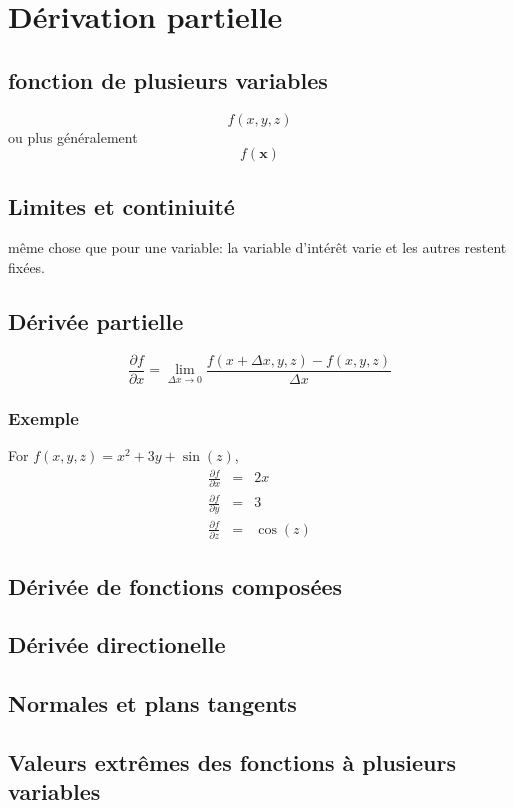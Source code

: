 \chapter{Dérivation partielle}
\section{fonction de plusieurs variables}
\begin{equation}
	f(x, y, z)
\end{equation}
ou plus généralement
\begin{equation}
	f ( \mathbf{x})
\end{equation}
\section{Limites et continiuité}
même chose que pour une variable: la variable d'intérêt varie et les autres restent fixées.
\section{Dérivée partielle}
\begin{equation}
	\frac{\partial f}{\partial x} = \lim_{\Delta x\rightarrow 0} \frac{f(x+\Delta x, y, z)-f(x, y, z)}{\Delta x}
\end{equation}
\subsection{Exemple}
For $f(x,y,z)=x^2+3y+\sin{(z)}$, 
\begin{eqnarray}
	\label{eq:deriveepartielle}
	\frac{\partial f}{\partial x} &=& 2x\nonumber\\
	\frac{\partial f}{\partial y} &=& 3\nonumber\\
	\frac{\partial f}{\partial z} &=& \cos{(z)}
\end{eqnarray}

\section{Dérivée de fonctions composées}
\section{Dérivée directionelle}
\section{Normales et plans tangents}
\section{Valeurs extrêmes des fonctions à plusieurs variables}

